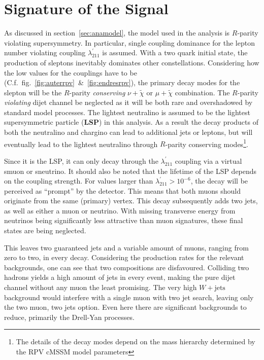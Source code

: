 \chapter{Signature of the Signal}
\label{cha:sig}

As discussed in section~\ref{sec:anamodel}, the model used in the analysis is $R$-parity violating supersymmetry. In particular, single coupling dominance for the lepton number violating coupling $\lambda^\prime_{211}$ is assumed. With a two quark initial state, the production of sleptons inevitably dominates other constellations. Considering how the low values for the couplings have to be (C.f.~fig.~\ref{fig:auterrpv}~\&~\ref{fig:endresrpv}), the primary decay modes for the slepton will be the $R$-parity \textit{conserving} $\nu + \tilde{\chi}$ or $\mu + \tilde{\chi}$ combination. The $R$-parity \textit{violating} dijet channel be neglected as it will be both rare and overshadowed by standard model processes. The lightest neutralino is assumed to be the lightest supersymmetric particle (\textbf{LSP}) in this analysis. As a result the decay products of both the neutralino and chargino can lead to additional jets or leptons, but will eventually lead to the lightest neutralino through $R$-parity conserving modes\footnote{The details of the decay modes depend on the mass hierarchy determined by the RPV cMSSM model parameters}. 


Since it is the LSP, it can only decay through the $\lambda^\prime_{211}$ coupling via a virtual smuon or sneutrino. It should also be noted that the lifetime of the LSP depends on the coupling strength. For values larger than $\lambda^\prime_{211} > 10^{-6}$, the decay will be perceived as ``prompt'' by the detector. This means that both muons should originate from the same (primary) vertex. This decay subsequently adds two jets, as well as either a muon or neutrino. With missing transverse energy from neutrinos being significantly less attractive than muon signatures, these final states are being neglected. 


This leaves two guaranteed jets and a variable amount of muons, ranging from zero to two, in every decay. Considering the production rates for the relevant backgrounds, one can see that two compositions are disfavoured. Colliding two hadrons yields a high amount of jets in every event, making the pure dijet channel without any muon the least promising. The very high $W + \text{jets}$ background would interfere with a single muon with two jet search, leaving only the two muon, two jets option. Even here there are significant backgrounds to reduce, primarily the Drell-Yan processes.

